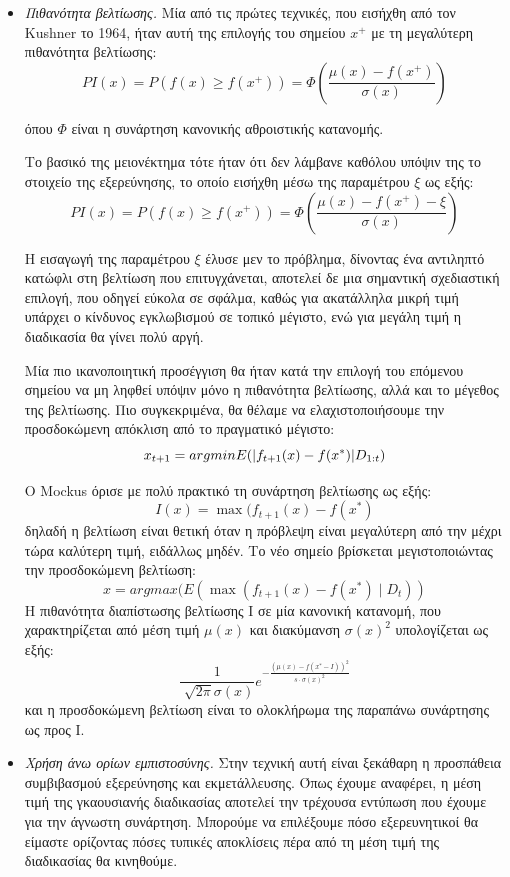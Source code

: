 \documentclass{article}
\DeclarePairedDelimiter\abs{\lvert}{\rvert}%
\begin{document}
\begin{itemize}
\item \textit{Πιθανότητα βελτίωσης.} Μία από τις πρώτες τεχνικές, που εισήχθη από τον Kushner το 1964, ήταν αυτή της επιλογής του σημείου $x^+$ με τη μεγαλύτερη πιθανότητα βελτίωσης:
$$PI(x)= P(f(x) \geq f(x^+)) = \Phi (\frac{\mu(x) - f(x^+)}{\sigma(x)})$$

όπου $\Phi$ είναι η συνάρτηση κανονικής αθροιστικής κατανομής.

Το βασικό της μειονέκτημα τότε ήταν ότι δεν λάμβανε καθόλου υπόψιν της το στοιχείο της εξερεύνησης, το οποίο εισήχθη μέσω της παραμέτρου $\xi$ ως εξής:
$$PI(x)= P(f(x) \geq f(x^+)) = \Phi (\frac{\mu(x) - f(x^+) - \xi}{\sigma(x)})$$

Η εισαγωγή της παραμέτρου $\xi$ έλυσε μεν το πρόβλημα, δίνοντας ένα αντιληπτό κατώφλι στη βελτίωση που επιτυγχάνεται, αποτελεί δε μια σημαντική σχεδιαστική επιλογή, που οδηγεί εύκολα σε σφάλμα, καθώς για ακατάλληλα μικρή τιμή υπάρχει ο κίνδυνος εγκλωβισμού σε τοπικό μέγιστο, ενώ για μεγάλη τιμή η διαδικασία θα γίνει πολύ αργή.

Μία πιο ικανοποιητική προσέγγιση θα ήταν κατά την επιλογή του επόμενου σημείου να μη ληφθεί υπόψιν μόνο η πιθανότητα βελτίωσης, αλλά και το μέγεθος της βελτίωσης. Πιο συγκεκριμένα, θα θέλαμε να ελαχιστοποιήσουμε την προσδοκώμενη απόκλιση από το πραγματικό μέγιστο:
$$x_{t+1}= argmin E(\abs{f_{t+1}(x) -f(x^*)} D_{1:t})$$

O Mockus όρισε με πολύ πρακτικό τη συνάρτηση βελτίωσης ως εξής:
$$I(x)= \max ( f_{t+1} (x) - f(x^*)$$
δηλαδή η βελτίωση είναι θετική όταν η πρόβλεψη είναι μεγαλύτερη από την μέχρι τώρα καλύτερη τιμή, ειδάλλως μηδέν. Το νέο σημείο βρίσκεται μεγιστοποιώντας την προσδοκώμενη βελτίωση:
$$x=argmax(E( \max( f_{t+1}(x) - f(x^*) \mid D_t))$$
H πιθανότητα διαπίστωσης βελτίωσης I σε μία κανονική κατανομή, που χαρακτηρίζεται από μέση τιμή $\mu(x)$ και διακύμανση $\sigma(x)^2$ υπολογίζεται ως εξής:
$$ \frac{1}{\sqrt[]{2 \pi} \sigma(x)} e^{- \frac{(\mu(x)- f(x^*-I))^2}{s \cdot \sigma(x)^2}}$$
και η προσδοκώμενη βελτίωση είναι το ολοκλήρωμα της παραπάνω συνάρτησης ως προς I.
\item \textit{Χρήση άνω ορίων εμπιστοσύνης.} Στην τεχνική αυτή είναι ξεκάθαρη η προσπάθεια συμβιβασμού εξερεύνησης και εκμετάλλευσης. Όπως έχουμε αναφέρει, η μέση τιμή της γκαουσιανής διαδικασίας αποτελεί την τρέχουσα εντύπωση που έχουμε για την άγνωστη συνάρτηση. Μπορούμε να επιλέξουμε πόσο εξερευνητικοί θα είμαστε ορίζοντας πόσες τυπικές αποκλίσεις πέρα από τη μέση τιμή της διαδικασίας θα κινηθούμε.
\end{itemize}
\end{document}
